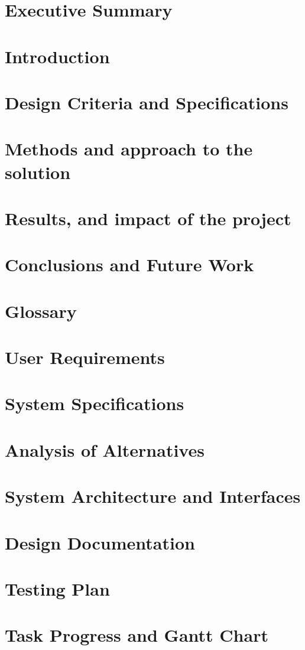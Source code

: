 \documentclass[12pt]{article}
\begin{document}
  
  \section*{Executive Summary}
  \tableofcontents
  \section{Introduction}
  \section{Design Criteria and Specifications}
  \section{Methods and approach to the solution}
  \section{Results, and impact of the project}
  \section{Conclusions and Future Work}
  
  
  \appendix
  \section{Glossary}
  \section{User Requirements}
  \section{System Specifications}
  \section{Analysis of Alternatives}
  \section{System Architecture and Interfaces}
  \section{Design Documentation}
  \section{Testing Plan}
  \section{Task Progress and Gantt Chart}
\end{document}
